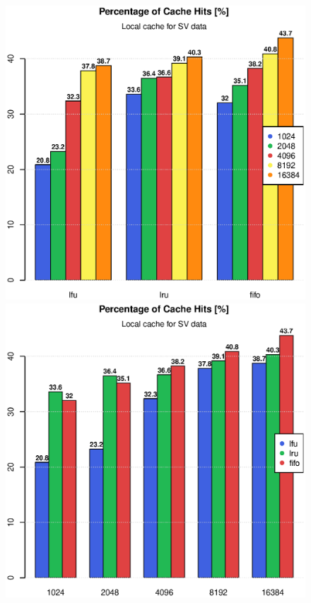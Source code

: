 \documentclass[a4paper,11pt]{scrartcl}
\begin{document}
\begin{figure}[h!]
\begin{minipage}{0.48\linewidth}
\end{minipage}
\begin{minipage}{0.48\linewidth}
\centering
\includegraphics[width=0.9\linewidth]{img/tests/nop2p_sv_1.eps}
\end{minipage}
\begin{minipage}{0.48\linewidth}
\centering
\includegraphics[width=0.9\linewidth]{img/tests/nop2p_sv_2.eps}
\end{minipage}

\end{figure}
\end{document}

